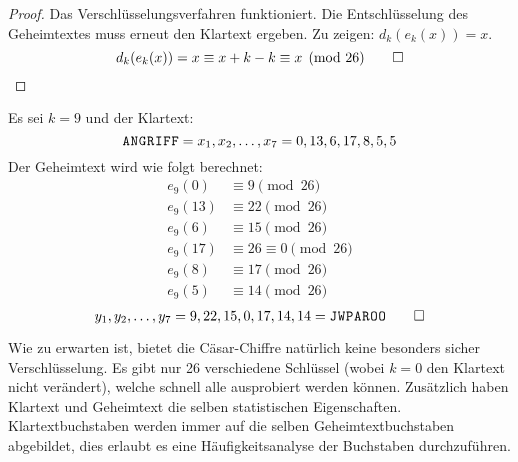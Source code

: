 \noindent
\begin{proof}
  Das Verschlüsselungsverfahren funktioniert.
  Die Entschlüsselung des Geheimtextes muss erneut den Klartext ergeben.
  Zu zeigen: $d_k(e_k(x)) = x$.
  \begin{equation*}
    d_k(e_k(x)) = x \equiv x + k - k \equiv x \pmod{26} \qedhere
  \end{equation*}
\end{proof}
\begin{example}
  Es sei $k = 9$ und der Klartext:
  \begin{equation*}
    \text{\texttt{A\kern 0.2mmN\kern 0.2mmG\kern 0.2mmR\kern 0.2mmI\kern 0.2mmF\kern 0.2mmF}}
    = x_1,x_2,\dots,x_7 = 0,13,6,17,8,5,5
  \end{equation*}
  Der Geheimtext wird wie folgt berechnet:
  \begin{align*}
    e_9(0)  & \equiv 9 \pmod{26}           \\
    e_9(13) & \equiv 22 \pmod{26}          \\
    e_9(6)  & \equiv 15 \pmod{26}          \\
    e_9(17) & \equiv 26 \equiv 0 \pmod{26} \\
    e_9(8)  & \equiv 17 \pmod{26}          \\
    e_9(5)  & \equiv 14 \pmod{26}
  \end{align*}
  \begin{equation*}
    y_1,y_2,\dots,y_7 = 9,22,15,0,17,14,14 =
    \text{\texttt{J\kern 0.2mmW\kern 0.2mmP\kern 0.2mmA\kern 0.2mmR\kern 0.2mmO\kern 0.2mmO}} \qedhere
  \end{equation*}
\end{example}

\noindent
Wie zu erwarten ist, bietet die Cäsar-Chiffre natürlich keine besonders sicher Verschlüs\-selung.
Es gibt nur 26 verschiedene Schlüssel (wobei $k = 0$ den Klartext nicht verändert),
welche schnell alle ausprobiert werden können. Zusätzlich
haben Klartext und Geheimtext die selben statistischen Eigenschaften.
Klartextbuchstaben werden immer auf die selben Geheimtextbuchstaben abgebildet, dies
erlaubt es eine Häufigkeitsanalyse der Buchstaben durchzuführen.